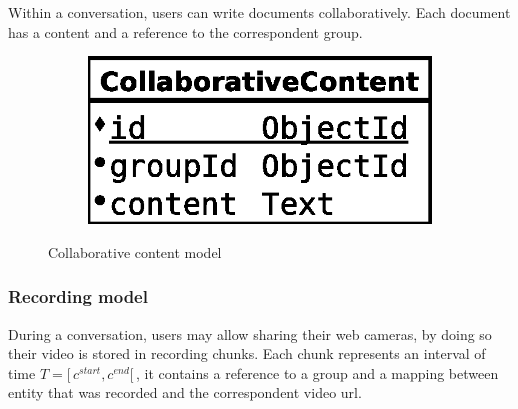 Within a conversation, users can write documents collaboratively. Each document has a content and a reference to the correspondent group. 

\begin{figure}[H]
    \centering
    \begin{subfigure}[b]{0.25\textwidth}
    	\includegraphics[width=\textwidth]{figures/model_collaborative_content}
    \end{subfigure}
    \caption{Collaborative content model}
\end{figure} 

\subsubsection{Recording model}

During a conversation, users may allow sharing their web cameras, by doing so their video is stored in recording chunks. Each chunk represents an interval of time  $T=[ \,c^{start},c^{end}[ \,$, it contains a reference to a group and a mapping between entity that was recorded and the correspondent video url.

